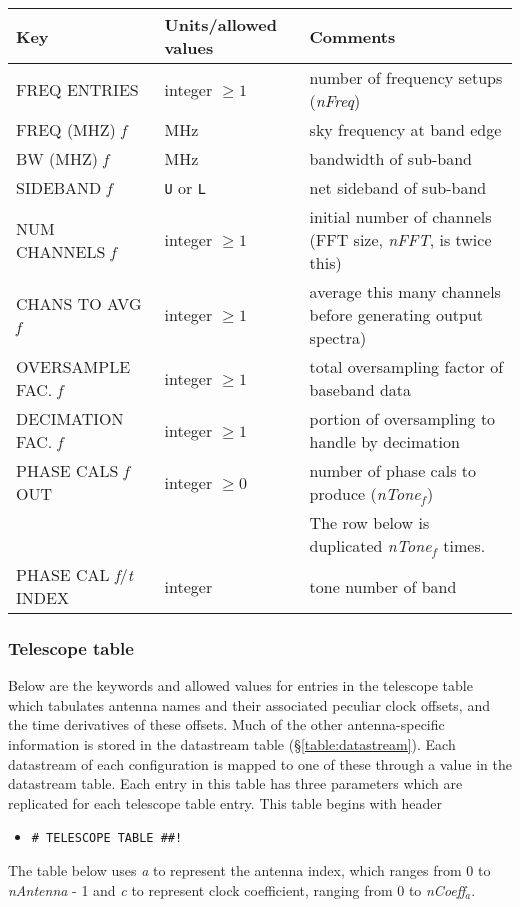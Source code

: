 \begin{center}
\begin{tabular}{l l l}
\hline
Key & Units/allowed values & Comments \\
\hline
FREQ ENTRIES & integer $\ge 1$ & number of frequency setups ({\em nFreq}) \\
\hline
FREQ (MHZ) {\em f} & MHz & sky frequency at band edge \\
BW (MHZ) {\em f} & MHz & bandwidth of sub-band \\
SIDEBAND {\em f} & {\tt U} or  {\tt L} & net sideband of sub-band \\
NUM CHANNELS {\em f} & integer $\ge 1$ & initial number of channels (FFT size, {\em nFFT}, is twice this) \\
CHANS TO AVG {\em f} & integer $\ge 1$ & average this many channels before generating output spectra) \\
OVERSAMPLE FAC. {\em f}  & integer $\ge 1$ & total oversampling factor of baseband data \\
DECIMATION FAC. {\em f}  & integer $\ge 1$ & portion of oversampling to handle by decimation \\
PHASE CALS {\em f} OUT & integer $\ge 0$ & number of phase cals to produce ({\em nTone}$_f$)\\
&& The row below is duplicated {\em nTone}$_f$ times. \\
PHASE CAL {\em f}/{\em t} INDEX & integer & tone number of band \\
\hline
\end{tabular}
\end{center}

\subsubsection{Telescope table}

Below are the keywords and allowed values for entries in the telescope table which tabulates antenna names and their associated peculiar clock offsets, and the time derivatives of these offsets.
Much of the other antenna-specific information is stored in the datastream table (\S\ref{table:datastream}).
Each datastream of each configuration is mapped to one of these through a value in the datastream table.
Each entry in this table has three parameters which are replicated for each telescope table entry.
This table begins with header 
\begin{itemize}
\item[] {\tt \verb+# TELESCOPE TABLE ##!+}
\end{itemize}
The table below uses {\em a} to represent the antenna index, which ranges from 0 to {\em nAntenna} - 1 and {\em c} to represent clock coefficient, ranging from 0 to {\em nCoeff}$_a$.

